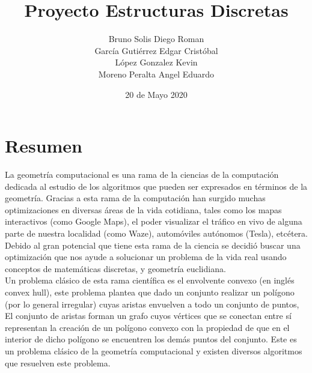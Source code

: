 \documentclass[]{article}
\title{Proyecto Estructuras Discretas}
\author{Bruno Solis Diego Roman\\García Gutiérrez Edgar Cristóbal\\López Gonzalez Kevin\\Moreno Peralta Angel Eduardo }
\date{20 de Mayo 2020}
\begin{document}
\maketitle
\section{Resumen}
\large
La geometría computacional es una rama de la ciencias de la computación dedicada al estudio de los algoritmos que pueden ser expresados en términos de la geometría. Gracias a esta rama de la computación han surgido muchas optimizaciones en diversas áreas de la vida cotidiana, tales como los mapas interactivos (como Google Maps), el poder visualizar el tráfico en vivo de alguna parte de nuestra localidad (como Waze), automóviles autónomos (Tesla), etcétera.\\
Debido al gran potencial que tiene esta rama de la ciencia se decidió buscar una optimización que nos ayude a solucionar un problema de la vida real usando conceptos de matemáticas discretas, y geometría euclidiana.\\

Un problema clásico de esta rama científica es el envolvente convexo (en inglés convex hull), este problema plantea que dado un conjunto realizar un polígono (por lo general irregular) cuyas aristas envuelven a todo un conjunto de puntos,
El conjunto de aristas forman un grafo cuyos vértices que se conectan entre sí representan la creación de un polígono convexo con la propiedad de que en el interior de dicho polígono se encuentren los demás puntos del conjunto.
Este es un problema clásico de la geometría computacional y existen diversos algoritmos que resuelven este problema. 
\end{document}
